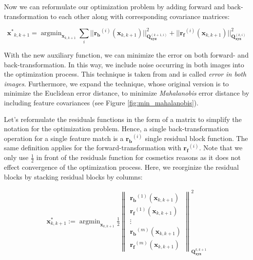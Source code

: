 \documentclass[12pt]{report}
\numberwithin{figure}{section}
\newcommand{\argmin}{\mathop{\mathrm{argmin}}}
\begin{document}
Now we can reformulate our optimization problem by adding forward and
back-transformation to each other along with corresponding covariance matrices:

\begin{equation} \label{eq:residuals_w_back_and_forward} \mathbf{x^*}_{k,k+1} =
\argmin_{\mathbf{x}_{k,k+1}} \sum_i
||\mathbf{r_b}^{(i)}(\mathbf{x}_{k,k+1})||^2_{\mathbf{Q}^{(k+1,i)}_{\mathbf{xyz}}}+
||\mathbf{r_f}^{(i)}(\mathbf{x}_{k,k+1})
||^2_{\mathbf{Q}^{(k,i)}_{\mathbf{xyz}}} \end{equation}

With the new auxiliary function, we can minimize the error on both forward- and
back-transformation.  In this way, we include noise occurring in both images
into the optimization process. This technique is taken from
\parencite[see][101]{RichardHartley2003} and is called \textit{error in both 
images}.
Furthermore, we expand the technique, whose original version is to minimize the
Euclidean error distance, to minimize \textit{Mahalanobis} error distance by
including feature covariances (see Figure \ref{fig:min_mahalanobis}).

Let's reformulate the residuals functions in the form of a matrix to simplify
the notation for the optimization problem.  Hence, a single back-transformation
operation for a single feature match is a $\mathbf{r_b}^{(i)}$ single residual
block function.  The same definition applies for the forward-transformation
with $\mathbf{r_f}^{(i)}$.  Note that we only use $\frac{1}{2}$ in front of the
residuals function for cosmetics reasons as it does not effect convergence of
the optimization process.  Here, we reorginize the residual blocks by stacking
residual blocks by columns:

\begin{equation} \label{eq:residuals_w_back_and_forward_matrix}
  \begin{aligned} \mathbf{x}^*_{k,k+1} :=
\argmin_{\mathbf{x}_{k,k+1}} \frac{1}{2} \begin{Vmatrix}
\mathbf{r_b}^{(1)}(\mathbf{x}_{k,k+1}) \\
\mathbf{r_f}^{(1)}(\mathbf{x}_{k,k+1}) \\ \vdots \\
\mathbf{r_b}^{(m)}(\mathbf{x}_{k,k+1}) \\
\mathbf{r_f}^{(m)}(\mathbf{x}_{k,k+1})
\end{Vmatrix}^2_{\mathbf{Q}^{k,k+1}_{\mathbf{xyz}}}
\end{aligned} \end{equation}
\end{document}
